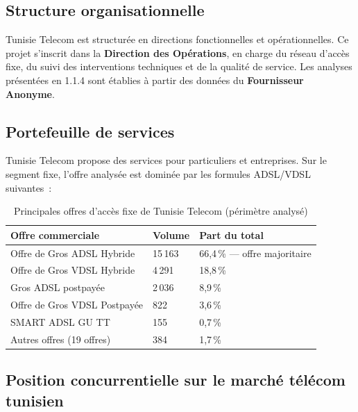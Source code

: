 \documentclass[10pt,a4paper]{report}
\begin{document}
\subsection{Structure organisationnelle}

Tunisie Telecom est structurée en directions fonctionnelles et opérationnelles. Ce projet s'inscrit dans la \textbf{Direction des Opérations}, en charge du réseau d'accès fixe, du suivi des interventions techniques et de la qualité de service. Les analyses présentées en 1.1.4 sont établies à partir des données du \textbf{Fournisseur Anonyme}.

\subsection{Portefeuille de services}

Tunisie Telecom propose des services pour particuliers et entreprises. Sur le segment fixe, l'offre analysée est dominée par les formules ADSL/VDSL suivantes~:

\begin{table}[H]
\centering
\caption{Principales offres d'accès fixe de Tunisie Telecom (périmètre analysé)}
\begin{tabularx}{\textwidth}{L{5.5cm} C{2cm} L{6cm}}
\toprule
{}
\textbf{\color{ttblue}Offre commerciale} & \textbf{\color{ttblue}Volume} & \textbf{\color{ttblue}Part du total} \\
\midrule
Offre de Gros ADSL Hybride     & 15\,163 & 66,4\,\% --- offre majoritaire \\
Offre de Gros VDSL Hybride     &  4\,291 & 18,8\,\% \\
Gros ADSL postpayée            &  2\,036 &  8,9\,\% \\
Offre de Gros VDSL Postpayée   &    822  &  3,6\,\% \\
SMART ADSL GU TT               &    155  &  0,7\,\% \\
Autres offres (19 offres)      &    384  &  1,7\,\% \\
\bottomrule
\end{tabularx}
\label{tab:offres}
\end{table}

\subsection{Position concurrentielle sur le marché télécom tunisien}
\end{document}
